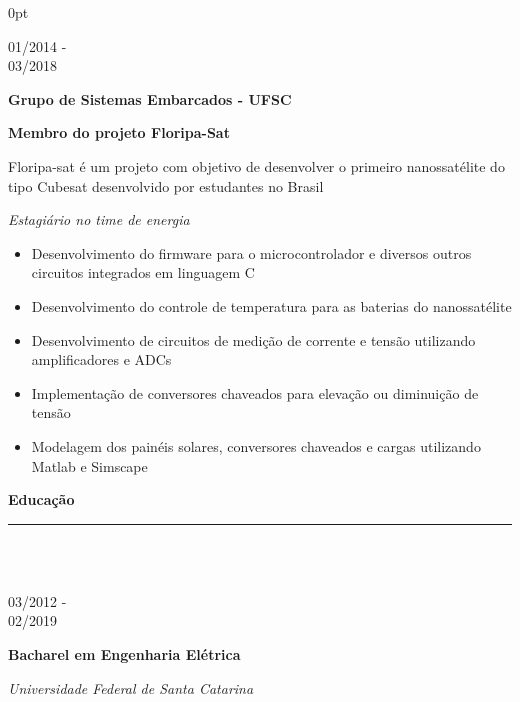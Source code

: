 \documentclass[a4paper]{article}
\begin{document}
\begin{adjustwidth}{\parindent}{0pt}
\begin{minipage}[t]{0.65\textwidth}
\begin{minipage}[t]{0.2\textwidth}
  \large{01/2014 - \\ 03/2018}
\end{minipage}
\begin{minipage}[t]{0.8\textwidth}
{
  \setlength{\parskip}{5.5pt}
  \Large{\textbf{Grupo de Sistemas Embarcados - UFSC}}
  
  \large{\textbf{Membro do projeto Floripa-Sat}}
  
  \large{Floripa-sat é um projeto com objetivo de desenvolver o primeiro nanossatélite do tipo Cubesat desenvolvido por estudantes no Brasil}
  
  \large{\textit{Estagiário no time de energia}}
}
\begin{itemize}
  \item \normalsize{Desenvolvimento do firmware para o microcontrolador e diversos outros circuitos integrados em linguagem C}
  \item Desenvolvimento do controle de temperatura para as baterias do nanossatélite
  \item Desenvolvimento de circuitos de medição de corrente e tensão utilizando amplificadores e ADCs
  \item Implementação de conversores chaveados para elevação ou diminuição de tensão
  \item Modelagem dos painéis solares, conversores chaveados e cargas utilizando Matlab e Simscape
\end{itemize}
  
\end{minipage}

\Large{\textbf{Educação}} \normalsize \\ \rule{\textwidth}{0.5pt} \\ \\
\begin{minipage}[t]{0.2\textwidth}
\large{03/2012 - \\ 02/2019}
\end{minipage}
\begin{minipage}[t]{0.8\textwidth}
{
  \setlength{\parskip}{5.5pt}
  \Large{\textbf{Bacharel em Engenharia Elétrica}}
  
  \large{\textit{Universidade Federal de Santa Catarina}} \\
}
\end{minipage} \\ \\


\end{minipage}
\end{adjustwidth}
\end{document}
